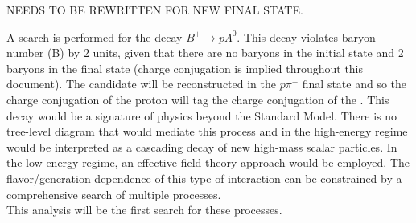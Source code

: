 
NEEDS TO BE REWRITTEN FOR NEW FINAL STATE.

A search is performed for the decay $B^+ \rightarrow p \Lambda^0$.
This decay violates baryon number (B) by 2 units, given that there are 
no baryons in the initial state and 2 baryons in the final state
(charge conjugation is implied throughout this document).
The \Lam candidate will be reconstructed in
the $p\pi^-$ final state and so the charge conjugation of the proton will tag the charge conjugation
of the \Lam. This decay would be a signature of physics beyond the Standard Model.
There is no tree-level diagram that would mediate this process and in the high-energy
regime would be interpreted as a cascading decay of new high-mass scalar particles.
In the low-energy regime, an effective field-theory approach would be employed.
The flavor/generation dependence of this type of interaction can be constrained
by a comprehensive search of multiple processes.\\

This analysis will be the first search for these processes.
